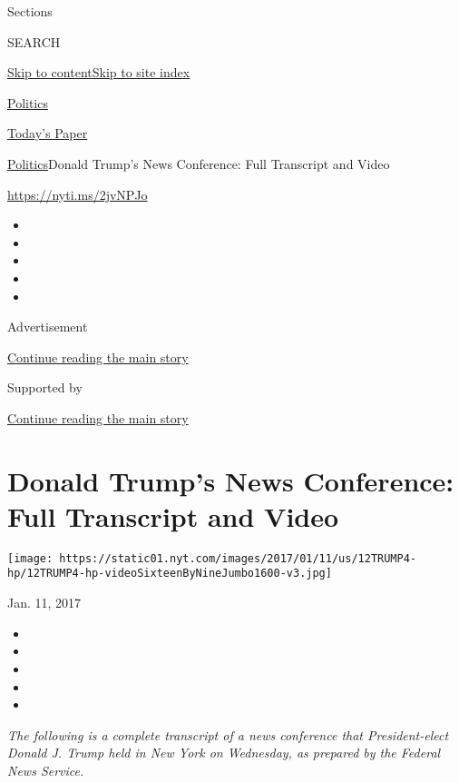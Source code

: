 Sections

SEARCH

\protect\hyperlink{site-content}{Skip to
content}\protect\hyperlink{site-index}{Skip to site index}

\href{https://www.nytimes.com/section/politics}{Politics}

\href{https://myaccount.nytimes.com/auth/login?response_type=cookie\&client_id=vi}{}

\href{https://www.nytimes.com/section/todayspaper}{Today's Paper}

\href{/section/politics}{Politics}\textbar{}Donald Trump's News
Conference: Full Transcript and Video

\url{https://nyti.ms/2jvNPJo}

\begin{itemize}
\item
\item
\item
\item
\item
\end{itemize}

Advertisement

\protect\hyperlink{after-top}{Continue reading the main story}

Supported by

\protect\hyperlink{after-sponsor}{Continue reading the main story}

\hypertarget{donald-trumps-news-conference-full-transcript-and-video}{%
\section{Donald Trump's News Conference: Full Transcript and
Video}\label{donald-trumps-news-conference-full-transcript-and-video}}

\texttt{[image: https://static01.nyt.com/images/2017/01/11/us/12TRUMP4-hp/12TRUMP4-hp-videoSixteenByNineJumbo1600-v3.jpg]}

Jan. 11, 2017

\begin{itemize}
\item
\item
\item
\item
\item
\end{itemize}

\emph{The following is a complete transcript of a news conference that
President-elect Donald J. Trump held in New York on Wednesday, as
prepared by the Federal News Service.}

